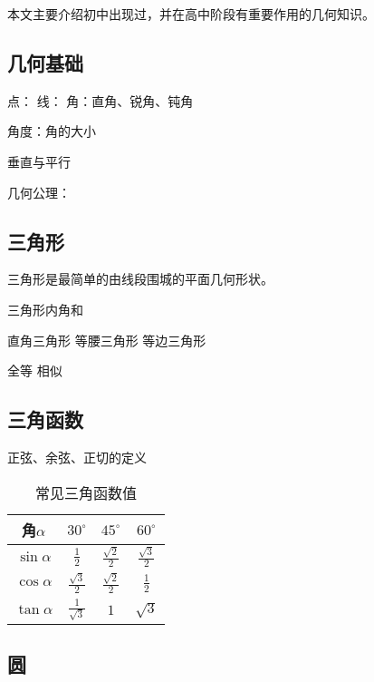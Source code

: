 
\begin{issues}
\issueDraft
\end{issues}

本文主要介绍初中出现过，并在高中阶段有重要作用的几何知识。

\subsection{几何基础}

点：
线：
角：直角、锐角、钝角

角度：角的大小

垂直与平行

几何公理：

\subsection{三角形}

三角形是最简单的由线段围城的平面几何形状。

三角形内角和

直角三角形
等腰三角形
等边三角形

全等
相似

\subsection{三角函数}

正弦、余弦、正切的定义

\begin{table}[ht]
\centering
\caption{常见三角函数值}\label{tab_HsGeBa1}
\begin{tabular}{|c|c|c|c|}
\hline
角$\alpha$ & $30^{\circ}$ & $45^{\circ}$ & $60^{\circ}$ \\
\hline
$\sin\alpha$ & $\displaystyle\frac{1}{2}$ & $\displaystyle\frac{\sqrt{2}}{2}$ & $\displaystyle\frac{\sqrt{3}}{2}$ \\
\hline
$\cos\alpha$ & $\displaystyle\frac{\sqrt{3}}{2}$& $\displaystyle\frac{\sqrt{2}}{2}$ &  $\displaystyle\frac{1}{2}$ \\
\hline
$\tan\alpha$ & $\displaystyle\frac{1}{\sqrt{3}}$ & $1$ & $\sqrt{3}$ \\
\hline
\end{tabular}
\end{table}
\subsection{圆}

